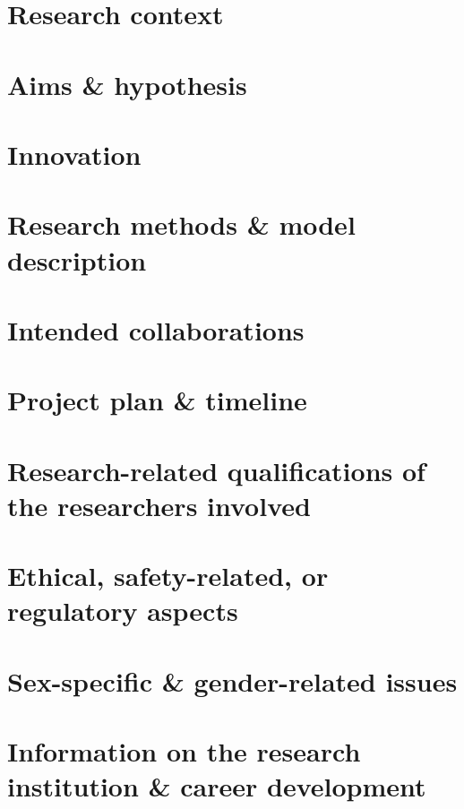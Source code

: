 \documentclass[11pt, a4paper, oneside, article]{memoir}
\begin{document}
\setlength{\baselineskip}{15pt}         %



\frontmatter
\tableofcontents*

\mainmatter
\chapter{Research context}
\label{c:context}


\chapter{Aims \& hypothesis}
\label{c:aim_hyp}


\chapter{Innovation}
\label{c:innovation}


\chapter{Research methods \& model description}
\label{c:methods}


\chapter{Intended collaborations}
\label{c:collab}


\chapter{Project plan \& timeline}
\label{c:project_plan}


\chapter{Research-related qualifications of the researchers involved}


\chapter{Ethical, safety-related, or regulatory aspects}


\chapter{Sex-specific \& gender-related issues}


\chapter{Information on the research institution \& career development}
\label{c:info_dev}


\vfill


\appendix
\printglossaries

\newpage
\printbibliography[env=bibliography]
\end{document}
